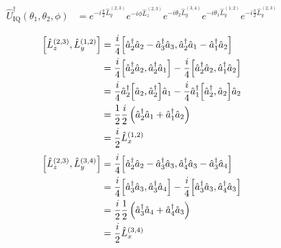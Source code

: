 \begin{equation}
	\begin{split}
		\hat{U}_\text{IQ}^\dagger(\theta_1,\theta_2,\phi)
		&=
		e^{-i\frac{\pi}{2}\hat{L}_y^{(2,3)}}
		e^{-i\phi\hat{L}_z^{(2,3)}}
		e^{-i\theta_2\hat{L}_y^{(3,4)}}
		e^{-i\theta_1\hat{L}_y^{(1,2)}}
		e^{-i\frac{\pi}{2}\hat{L}_y^{(2,3)}}
	\end{split}
\end{equation}

\begin{equation}
	\begin{split}
		\comm{\hat{L}_z^{(2,3)}}{\hat{L}_y^{(1,2)}}
		&=
		\frac{i}{4}
		\comm{
			\hat{a}_2^\dagger
			\hat{a}_2
			-
			\hat{a}_3^\dagger
			\hat{a}_3
		}{
			\hat{a}_2^\dagger
			\hat{a}_1
			-
			\hat{a}_1^\dagger
			\hat{a}_2
		}
		\\
		&=
		\frac{i}{4}
		\comm{
			\hat{a}_2^\dagger
			\hat{a}_2
		}{
			\hat{a}_2^\dagger
			\hat{a}_1
		}
		-
		\frac{i}{4}
		\comm{
			\hat{a}_2^\dagger
			\hat{a}_2
		}{
			\hat{a}_1^\dagger
			\hat{a}_2
		}
		\\
		&=
		\frac{i}{4}
		\hat{a}_2^\dagger
		\comm{\hat{a}_2}{\hat{a}_2^\dagger}
		\hat{a}_1
		-
		\frac{i}{4}
		\hat{a}_1^\dagger
		\comm{\hat{a}_2^\dagger}{\hat{a}_2}
		\hat{a}_2
		\\
		&=
		\frac{1}{2}
		\frac{i}{2}
		\left(
			\hat{a}_2^\dagger
			\hat{a}_1
			+
			\hat{a}_1^\dagger
			\hat{a}_2
		\right)
		\\
		&=
		\frac{i}{2}\hat{L}_x^{(1,2)}
	\end{split}
\end{equation}
\begin{equation}
	\begin{split}
		\comm{\hat{L}_z^{(2,3)}}{\hat{L}_y^{(3,4)}}
		&=
		\frac{i}{4}
		\comm{
			\hat{a}_2^\dagger
			\hat{a}_2
			-
			\hat{a}_3^\dagger
			\hat{a}_3
		}{
			\hat{a}_4^\dagger
			\hat{a}_3
			-
			\hat{a}_3^\dagger
			\hat{a}_4		
		}
		\\
		&=
		\frac{i}{4}
		\comm{
			\hat{a}_3^\dagger
			\hat{a}_3
		}{
			\hat{a}_3^\dagger
			\hat{a}_4		
		}
		-
		\frac{i}{4}
		\comm{
			\hat{a}_3^\dagger
			\hat{a}_3
		}{
			\hat{a}_4^\dagger
			\hat{a}_3
		}
		\\
		&=
		\frac{i}{2}
		\frac{1}{2}
		\left(
			\hat{a}_3^\dagger
			\hat{a}_4
			+
			\hat{a}_4^\dagger
			\hat{a}_3
		\right)
		\\
		&=
		\frac{i}{2}
		\hat{L}_x^{(3,4)}
	\end{split}
\end{equation}

